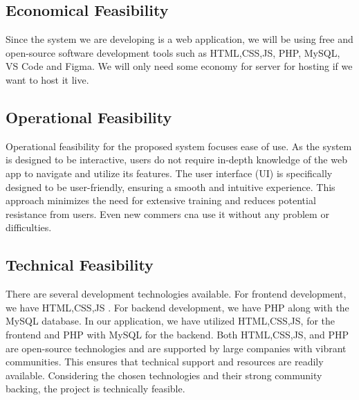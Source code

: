 \subsection{Economical Feasibility}
Since the system we are developing is a web application, we will be using free and open-source software development tools such as HTML,CSS,JS, PHP, MySQL, VS Code and Figma. We will only need some economy for server for hosting if we want to host it live.
\subsection{Operational Feasibility}
Operational feasibility for the proposed system focuses ease of use. As the system is designed to be interactive, users do not require in-depth knowledge of the web app to navigate and utilize its features. The user interface (UI) is specifically designed to be user-friendly, ensuring a smooth and intuitive experience. This approach minimizes the need for extensive training and reduces potential resistance from users. Even new commers cna use it without any problem or difficulties. 
\subsection{Technical Feasibility}
There are several development technologies available. For frontend development, we have HTML,CSS,JS . For backend development, we have PHP along with the MySQL database. In our application, we have utilized HTML,CSS,JS, for the frontend and PHP with MySQL for the backend. Both HTML,CSS,JS, and PHP are open-source technologies and are supported by large companies with vibrant communities. This ensures that technical support and resources are readily available. Considering the chosen technologies and their strong community backing, the project is technically feasible.
\newpage


